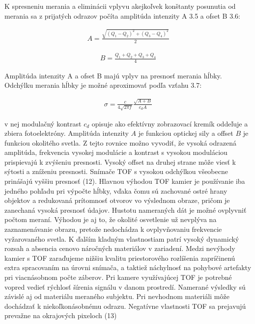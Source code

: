 K spresneniu merania a eliminácii vplyvu akejkoľvek konštanty posunutia od merania sa z
prijatých odrazov počíta amplitúda intenzity A 3.5 a ofset B 3.6:

\begin{equation}
\label{eq5}
\begin{aligned}
A=\frac{\sqrt{\left(Q_1 - Q_2\right)^2 + \left(Q_3 - Q_4\right)^2 }} {2} 
\end{aligned}
\end{equation}

\begin{equation}
\label{eq6}
\begin{aligned}
B=\frac{Q_1 + Q_2 +Q_3 + Q_4}{4} 
\end{aligned}
\end{equation}

Amplitúda intenzity A a ofset B majú vplyv na presnosť merania hĺbky. Odchýlku merania hĺbky je možné aproximovať podľa vzťahu 3.7:

\begin{equation}
\label{eq7}
\begin{aligned}
\sigma=\frac{c}{4\sqrt{2 \pi f}} \frac{\sqrt{A+B}}{c_d A}
\end{aligned}
\end{equation}

v nej modulačný kontrast $ c_d $ opisuje ako efektívny zobrazovací kremík oddeľuje a zbiera fotoelektróny. Amplitúda intenzity $ A $ je funkciou optickej sily a offset $ B $ je funkciou okolitého svetla. Z tejto rovnice možno vyvodiť, že vysoká odrazená amplitúda, frekvencia vysokej modulácie a kontrast s vysokou moduláciou prispievajú k zvýšeniu presnosti. Vysoký offset na druhej strane môže viesť k sýtosti a zníženiu presnosti. Snímače TOF s vysokou odchýlkou všeobecne prinášajú vyššiu presnosť (12). Hlavnou výhodou TOF kamier je používanie iba jedného pohľadu pri výpočte hĺbky, vďaka čomu sú zachované ostré hrany objektov a redukovaná prítomnosť otvorov vo výslednom obraze, pričom je zanechaná vysoká presnosť údajov. Hustotu nameraných dát je možné ovplyvniť počtom meraní. Výhodou je aj to, že okolité osvetlenie už nevplýva na zaznamenávanie obrazu, pretože nedochádza k ovplyvňovaniu frekvencie vyžarovaného svetla. K ďalším kladným vlastnostiam patrí vysoký dynamický rozsah a absencia cenovo náročných materiálov v zariadení. Medzi nevýhody kamier s TOF zaraďujeme nižšiu kvalitu priestorového rozlíšenia zapríčinenú extra spracovaním na úrovni snímača, a taktiež náchylnosť na pohybové artefakty pri viacnásobnom počte záberov. Pri kamere využívajúcej TOF je potrebné vopred vedieť rýchlosť šírenia signálu v danom prostredí. Namerané výsledky sú závislé aj od materiálu meraného subjektu. Pri nevhodnom materiáli môže dochádzať k niekoľkonásobnému odrazu. Negatívne vlastnosti TOF sa prejavujú prevažne na okrajových pixeloch (13)

